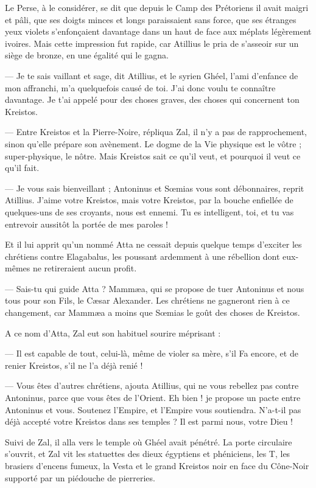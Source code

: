 \documentclass[a4paper, 11pt, oneside, polutonikogreek, french]{article}
\begin{document}
Le Perse, à le considérer, se dit que depuis le Camp des Prétoriens il avait maigri et pâli, que ses doigts minces et longs paraissaient sans force, que ses étranges yeux violets s'enfonçaient davantage dans un haut de face aux méplats légèrement ivoires. Mais cette impression fut rapide, car Atillius le pria de s'asseoir sur un siège de bronze, en une égalité qui le gagna.

--- Je te sais vaillant et sage, dit Atillius, et le syrien Ghéel, l'ami d'enfance de mon affranchi, m'a quelquefois causé de toi. J'ai donc voulu te connaître davantage. Je t'ai appelé pour des choses graves, des choses qui concernent ton Kreistos.

--- Entre Kreistos et la Pierre-Noire, répliqua Zal, il n'y a pas de rapprochement, sinon qu'elle prépare son avènement. Le dogme de la Vie physique est le vôtre ; super-physique, le nôtre. Mais Kreistos sait ce qu'il veut, et pourquoi il veut ce qu'il fait.

--- Je vous sais bienveillant ; Antoninus et Sœmias vous sont débonnaires, reprit Atillius. J'aime votre Kreistos, mais votre Kreistos, par la bouche enfiellée de quelques-uns de ses croyants, nous est ennemi. Tu es intelligent, toi, et tu vas entrevoir aussitôt la portée de mes paroles !

Et il lui apprit qu'un nommé Atta ne cessait depuis quelque temps d'exciter les chrétiens contre Elagabalus, les poussant ardemment à une rébellion dont eux-mêmes ne retireraient aucun profit.

--- Sais-tu qui guide Atta ? Mammæa, qui se propose de tuer Antoninus et nous tous pour son Fils, le Cæsar Alexander. Les chrétiens ne gagneront rien à ce changement, car Mammæa a moins que Sœmias le goût des choses de Kreistos.

A ce nom d'Atta, Zal eut son habituel sourire méprisant :

--- Il est capable de tout, celui-là, même de violer sa mère, s'il Fa encore, et de renier Kreistos, s'il ne l'a déjà renié !

--- Vous êtes d'autres chrétiens, ajouta Atillius, qui ne vous rebellez pas contre Antoninus, parce que vous êtes de l'Orient. Eh bien ! je propose un pacte entre Antoninus et vous. Soutenez l'Empire, et l'Empire vous soutiendra. N'a-t-il pas déjà accepté votre Kreistos dans ses temples ? Il est parmi nous, votre Dieu !

Suivi de Zal, il alla vers le temple où Ghéel avait pénétré. La porte circulaire s'ouvrit, et Zal vit les statuettes des dieux égyptiens et phéniciens, les T, les brasiers d'encens fumeux, la Vesta et le grand Kreistos noir en face du Cône-Noir supporté par un piédouche de pierreries.
\end{document}
